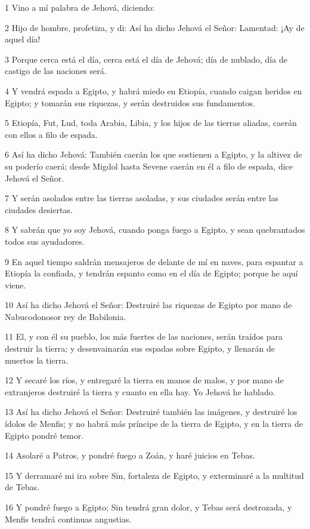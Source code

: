 \par 1 Vino a mí palabra de Jehová, diciendo:
\par 2 Hijo de hombre, profetiza, y di: Así ha dicho Jehová el Señor: Lamentad: ¡Ay de aquel día!
\par 3 Porque cerca está el día, cerca está el día de Jehová; día de nublado, día de castigo de las naciones será.
\par 4 Y vendrá espada a Egipto, y habrá miedo en Etiopía, cuando caigan heridos en Egipto; y tomarán sus riquezas, y serán destruidos sus fundamentos.
\par 5 Etiopía, Fut, Lud, toda Arabia, Libia, y los hijos de las tierras aliadas, caerán con ellos a filo de espada.
\par 6 Así ha dicho Jehová: También caerán los que sostienen a Egipto, y la altivez de su poderío caerá; desde Migdol hasta Sevene caerán en él a filo de espada, dice Jehová el Señor.
\par 7 Y serán asolados entre las tierras asoladas, y sus ciudades serán entre las ciudades desiertas.
\par 8 Y sabrán que yo soy Jehová, cuando ponga fuego a Egipto, y sean quebrantados todos sus ayudadores.
\par 9 En aquel tiempo saldrán mensajeros de delante de mí en naves, para espantar a Etiopía la confiada, y tendrán espanto como en el día de Egipto; porque he aquí viene.
\par 10 Así ha dicho Jehová el Señor: Destruiré las riquezas de Egipto por mano de Nabucodonosor rey de Babilonia.
\par 11 El, y con él su pueblo, los más fuertes de las naciones, serán traídos para destruir la tierra; y desenvainarán sus espadas sobre Egipto, y llenarán de muertos la tierra.
\par 12 Y secaré los ríos, y entregaré la tierra en manos de malos, y por mano de extranjeros destruiré la tierra y cuanto en ella hay. Yo Jehová he hablado.
\par 13 Así ha dicho Jehová el Señor: Destruiré también las imágenes, y destruiré los ídolos de Menfis; y no habrá más príncipe de la tierra de Egipto, y en la tierra de Egipto pondré temor.
\par 14 Asolaré a Patros, y pondré fuego a Zoán, y haré juicios en Tebas.
\par 15 Y derramaré mi ira sobre Sin, fortaleza de Egipto, y exterminaré a la multitud de Tebas.
\par 16 Y pondré fuego a Egipto; Sin tendrá gran dolor, y Tebas será destrozada, y Menfis tendrá continuas angustias.
